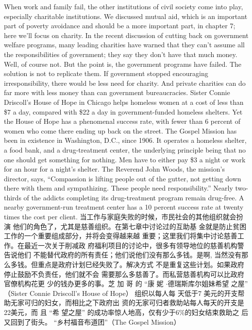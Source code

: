 \begin{paracol}{2}
When work and family fail, the other institutions of civil society come into play, especially charitable institutions. We discussed mutual aid, which is an important part of poverty
avoidance and should be a more important part, in chapter 7;
here we'll focus on charity. In the recent discussion of cutting
back on government welfare programs, many leading charities
have warned that they can't assume all the responsibilities of
government; they say they don't have that much money. Well,
of course not. But the point is, the government programs have failed. The solution is not to replicate them. If government
stopped encouraging irresponsibility, there would be less need
for charity. And private charities can do far more with less
money than can government bureaucracies. Sister Connie
Driscoll's House of Hope in Chicago helps homeless women at
a cost of less than \$7 a day, compared with \$22 a day in government-funded homeless shelters. Yet the House of Hope has
a phenomenal success rate, with fewer than 6 percent of women
who come there ending up back on the street. The Gospel Mission has been in existence in Washington, D.C., since 1906. It
operates a homeless shelter, a food bank, and a drug-treatment
center, the underlying principle being that no one should get
something for nothing. Men have to either pay \$3 a night or
work for an hour for a night's shelter. The Reverend John
Woods, the mission's director, says, ``Compassion is lifting people out of the gutter, not getting down there with them and
sympathizing. These people need responsibility.'' Nearly two-thirds of the addicts completing its drug-treatment program
remain drug-free. A nearby government-run treatment center
has a 10 percent success rate at twenty times the cost per client.
\switchcolumn
当工作与家庭失败的时候，市民社会的其他组织就会扮演
他们的角色了，尤其是慈善组织。在第七章中讨论过的互助基
金就是防止贫困工作的一个重要组成部分，并将会变得越来越
重要；这里我们将集中讨论慈善工作。在最近一次关于削减政
府福利项目的讨论中，很多有领导地位的慈善机构警告说他们
不能替代政府的所有责任；他们说他们没有那么多钱。是啊,
当然没有那么多钱。但重点是政府计划巳经失败了。解决方式
不是重复这些计划。如果政府停止鼓励不负责任，他们就不会
需要那么多慈善了。而私营慈善机构可以比政府官僚机构花更
少的钱办更多的事。芝 加 哥 的 “康 妮 $\cdot$德瑞斯库尔姐妹希望
之屋” （Sister Connie Driscoll’s House of Hope） 组织以每人每
天低于7 美元的开支帮助无家可归的妇女，而相比之下政府出
资的无家可归者救助站每人每天的开支是22美元，而 且 “希
望之屋” 的成功率惊人地高，仅有少于6\%的妇女结束救助之
后又回到了街头。 “乡村福音布道团”（The  Gospel Mission）

\end{paracol}
